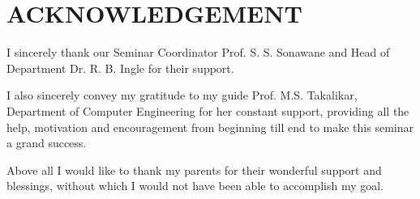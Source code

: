\documentclass[a4paper, 12pt]{article}
\begin{document}
\section*{ACKNOWLEDGEMENT}

\hspace{0.5cm} I sincerely thank our Seminar Coordinator Prof. S. S. Sonawane and Head of Department Dr. R. B. Ingle
for their support.
\par I also sincerely convey my gratitude to my guide Prof. M.S. Takalikar, Department of Computer Engineering for her constant
support, providing all the help, motivation and encouragement from beginning till end to make this seminar a grand success.
\par Above all I would like to thank my parents for their wonderful support and blessings, without which
I would not have been able to accomplish my goal.

\newpage
\tableofcontents

\newpage
\listoftables
\listoffigures

\newpage
\end{document}
